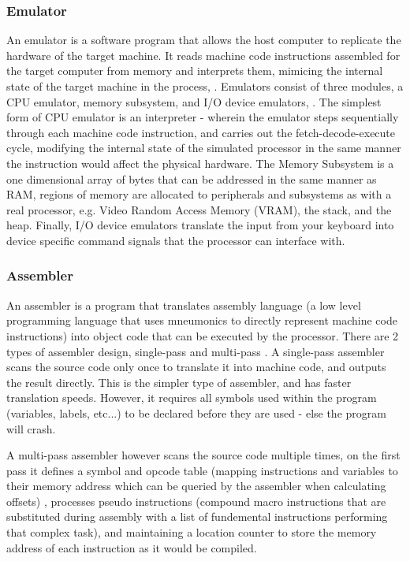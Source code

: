 \subsubsection{Emulator}
\label{sec:Emulator}
An emulator is a software program that allows the host computer to replicate the hardware of the target machine. It reads machine code instructions assembled for the target computer from memory and interprets them, mimicing the internal state of the target machine in the process, \textcite{CHIP-8-blog}. Emulators consist of three modules, a CPU emulator, memory subsystem, and I/O device emulators, \textcite{retroreversing}. The simplest form of CPU emulator is an interpreter - wherein the emulator steps sequentially through each machine code instruction, and carries out the fetch-decode-execute cycle, modifying the internal state of the simulated processor in the same manner the instruction would affect the physical hardware. The Memory Subsystem is a one dimensional array of bytes that can be addressed in the same manner as RAM, regions of memory are allocated to peripherals and subsystems as with a real processor, e.g. Video Random Access Memory (VRAM), the stack, and the heap. Finally, I/O device emulators translate the input from your keyboard into device specific command signals that the processor can interface with.

\subsubsection{Assembler}
\label{sec:Assembler}
An assembler is a program that translates assembly language (a low level programming language that uses mneumonics to directly represent machine code instructions) into object code that can be executed by the processor. There are 2 types of assembler design, single-pass and multi-pass \textcite{TOPPR-assembler}. A single-pass assembler scans the source code only once to translate it into machine code, and outputs the result directly. This is the simpler type of assembler, and has faster translation speeds. However, it requires all symbols used within the program (variables, labels, etc...) to be declared before they are used - else the program will crash. 

A multi-pass assembler however scans the source code multiple times, on the first pass it defines a symbol and opcode table (mapping instructions and variables to their memory address which can be queried by the assembler when calculating offsets) \textcite{TOPPR-assembler}, processes pseudo instructions (compound macro instructions that are substituted during assembly with a list of fundemental instructions performing that complex task), and maintaining a location counter to store the memory address of each instruction as it would be compiled.

